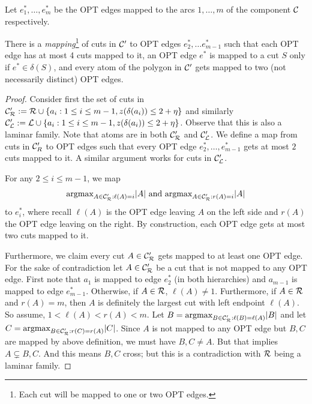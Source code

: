 Let $e^*_1,\dots,e^*_m$ be the OPT edges mapped to the arcs $1,\dots,m$ of the component $\cal C$ respectively.
\begin{lemma}\label{lem:4cutmapping}
There is a {\em mapping}\footnote{Each cut will be mapped to one or two OPT edges.} of cuts in ${\cal C}'$  to OPT edges $e^*_2,\dots e^*_{m-1}$ such that each OPT edge has at most 4 cuts mapped to it, an OPT edge $e^*$ is mapped to a cut $S$ only if $e^* \in \delta(S)$, and every atom of the polygon in ${\cal C}'$ gets mapped to two (not necessarily distinct) OPT edges. %
\end{lemma}
\begin{proof}
Consider first the set of cuts in $ {\cal C}'_{\mathcal{R}}:= {\mathcal{R}} \cup \{a_i:  1\leq i\leq m-1, z(\delta(a_i))\leq 2+\eta\}$ and similarly $ {\cal C}'_{\cal L}:= {\cal L} \cup \{a_i:  1\leq i\leq m-1, z(\delta(a_i))\leq 2+\eta\}$.  Observe that this is also a laminar family. Note that atoms are in both ${\cal C}'_{\mathcal{R}}$ and ${\cal C}'_{\cal L}$.
We  define a map from cuts in ${\cal C}'_R$  to OPT edges such that every OPT edge $e^*_2,\dots,e^*_{m-1}$ gets at most $2$ cuts mapped to it. A similar argument works for cuts in ${\cal C}'_{\cal L}$. %

For any  $2\leq i\leq m-1$, we map 
$$\textup{argmax}_{A\in {\cal C}'_{\mathcal{R}}: \ell(A)=i} |A|\text{ and }\textup{argmax}_{A\in {\cal C}'_{\mathcal{R}}: r(A)=i} |A|$$ 
to $e^*_i$, where recall $\ell(A)$ is the OPT edge leaving $A$ on the left side and $r(A)$ the OPT edge leaving on the right. 
By construction, each OPT edge gets at most two cuts mapped to it. 

Furthermore, we claim every cut $A\in {\cal C}'_{\mathcal{R}}$ gets mapped to at least one OPT edge.
For the sake of contradiction let $A\in {\cal C}'_{\mathcal{R}}$ be a cut that is not mapped to any OPT edge. First note that $a_1$ is mapped to edge $e_2^*$ (in both hierarchies) and $a_{m-1}$ is mapped to edge $e_{m-1}^*$. Otherwise, if $A\in {\mathcal{R}}$, $\ell(A)\neq 1$. Furthermore, if $A \in {\mathcal{R}}$ and $r(A)=m$, then $A$ is definitely the largest cut with left endpoint $\ell(A)$.
So assume, $1<\ell(A) < r(A)<m$.
Let $B=\textup{argmax}_{B\in {\cal C}'_{\mathcal{R}}: \ell(B)=\ell(A)} |B|$ and let $C=\textup{argmax}_{B\in {\cal C}'_{\mathcal{R}}: r(C)=r(A)} |C|$. Since $A$ is not mapped to any OPT edge but $B,C$ are mapped by above definition, we must have $B,C\neq A$. But that implies $A\subsetneq B,C$. And this means $B,C$ cross; but this is a contradiction with ${\mathcal{R}}$ being a laminar family.
\end{proof}
 

